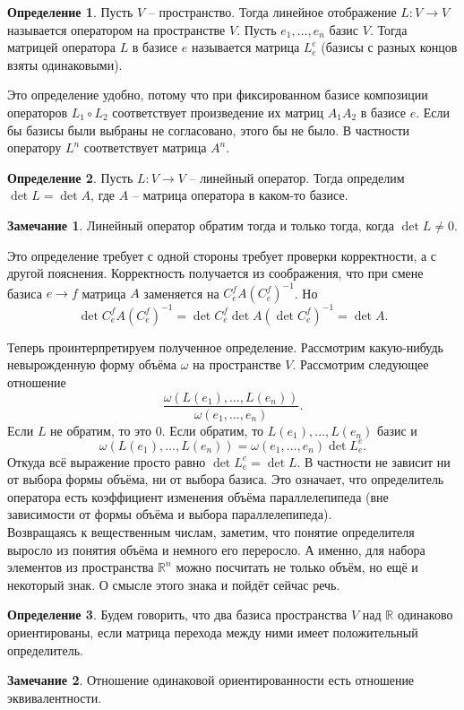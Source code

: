 \documentclass[10pt,a4paper,oneside]{book} %
\theoremstyle{definition}
\newtheorem*{rem}{Замечание}
\newtheorem*{defn}{Определение}
\newcommand{\mb}[1]{\mathbb{#1}}
\def\dfn{\begin{defn}}
\def\edfn{\end{defn}}
\def\rm{\begin{rem}}
\def\erm{\end{rem}}
\begin{document}
\dfn Пусть $V$ -- пространство. Тогда линейное отображение $L\colon V \to V$ называется оператором на пространстве $V$. Пусть $e_1,\dots, e_n$ базис $V$. Тогда матрицей оператора $L$ в базисе $e$ называется матрица $L_e^e$ (базисы с разных концов взяты одинаковыми).
\edfn

Это определение удобно, потому что при фиксированном базисе композиции операторов $L_1\circ L_2$ соответствует произведение их матриц $A_1A_2$ в базисе $e$. Если бы базисы были выбраны не согласовано, этого бы не было. В частности оператору $L^n$ соответствует матрица $A^n$.

\dfn Пусть $L\colon V \to V$ -- линейный оператор. Тогда определим $\det L=\det A$, где $A$ -- матрица оператора в каком-то базисе.
\edfn

\rm Линейный оператор обратим тогда и только тогда, когда $\det L \neq 0$.
\erm

Это определение требует с одной стороны требует проверки корректности, а с другой пояснения. Корректность получается из соображения, что при смене базиса $e\to f$ матрица $A$ заменяется на $C_e^fA (C_e^f)^{-1}$. Но
$$\det C_e^fA (C_e^f)^{-1}= \det C_e^f \det A (\det C_e^f)^{-1}= \det A.$$



Теперь проинтерпретируем полученное определение. Рассмотрим какую-нибудь невырожденную форму объёма $\omega$ на пространстве $V$. Рассмотрим следующее отношение
$$\frac{\omega(L(e_1),\dots,L(e_n))}{\omega(e_1,\dots,e_n)}.$$
Если $L$ не обратим, то это 0. Если обратим, то $L(e_1),\dots,L(e_n)$ базис и $$\omega(L(e_1),\dots,L(e_n))=\omega(e_1,\dots,e_n) \det L_e^e.$$
Откуда всё выражение просто равно $\det L_e^e=\det L$. В частности не зависит ни от выбора формы объёма, ни от выбора базиса.
Это означает, что определитель оператора есть коэффициент изменения объёма параллелепипеда (вне зависимости от формы объёма и выбора параллелепипеда).\\



Возвращаясь к вещественным числам, заметим, что понятие определителя выросло из понятия объёма и немного его переросло. А именно, для набора элементов из пространства $\mb R^n$ можно посчитать не только объём, но ещё и некоторый знак. О смысле этого знака и пойдёт сейчас речь.

\dfn Будем говорить, что два базиса пространства $V$ над $\mb R$ одинаково ориентированы, если матрица перехода между ними имеет положительный определитель.
\edfn

\rm Отношение одинаковой ориентированности есть отношение эквивалентности.
\erm
\end{document}

